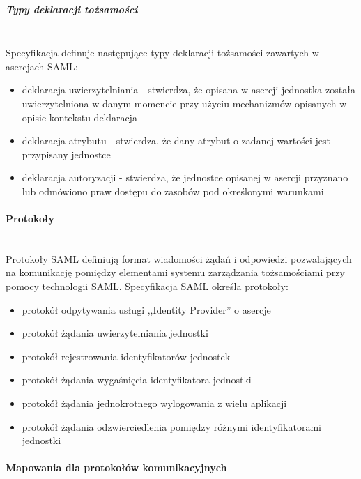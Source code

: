			\subparagraph{Typy deklaracji tożsamości}\mbox{}\\

				Specyfikacja definuje następujące typy deklaracji tożsamości zawartych w asercjach SAML\cite{Wisniewski05}:

				\begin{itemize}
				  \item deklaracja uwierzytelniania - stwierdza, że opisana w asercji jednostka została uwierzytelniona w danym momencie przy użyciu mechanizmów opisanych w opisie kontekstu deklaracja
				  \item deklaracja atrybutu - stwierdza, że dany atrybut o zadanej wartości jest przypisany jednostce
				  \item deklaracja autoryzacji - stwierdza, że jednostce opisanej w asercji przyznano lub odmówiono praw dostępu do zasobów pod określonymi warunkami
				 \end{itemize}

		\paragraph{Protokoły}\mbox{}\\ 

			Protokoły SAML definiują format wiadomości żądań i odpowiedzi pozwalających na komunikację pomiędzy elementami systemu zarządzania tożsamościami przy pomocy technologii SAML. Specyfikacja SAML określa protokoły:

			\begin{itemize}
			  \item protokół odpytywania usługi ,,Identity Provider'' o asercje
			  \item protokół żądania uwierzytelniania jednostki
			  \item protokół rejestrowania identyfikatorów jednostek
			  \item protokół żądania wygaśnięcia identyfikatora jednostki
			  \item protokół żądania jednokrotnego wylogowania z wielu aplikacji
			  \item protokół żądania odzwierciedlenia pomiędzy różnymi identyfikatorami jednostki
			\end{itemize}

		\paragraph{Mapowania dla protokołów komunikacyjnych}\mbox{}\\

